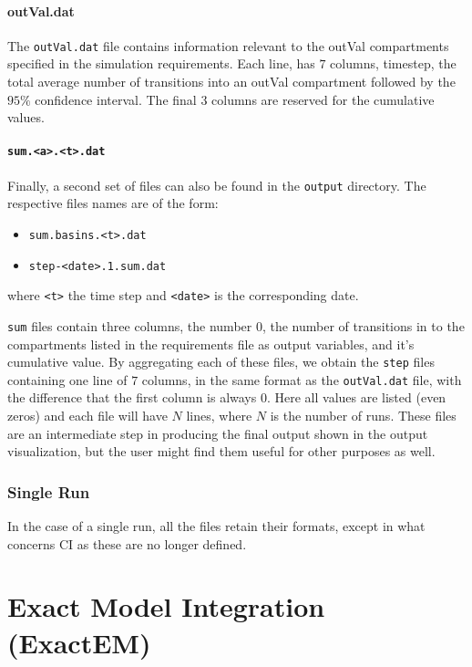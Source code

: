 \documentclass[a4paper, 11pt, fleqn]{paper}
\begin{document}
\paragraph*{outVal.dat}

The \texttt{outVal.dat} file contains information relevant to the outVal compartments specified in the simulation requirements.  Each line,  has $7$ columns, timestep,  the total average number of transitions into an outVal compartment followed by the $95\%$ confidence interval. The final $3$ columns are reserved for the cumulative values.

\paragraph*{\texttt{sum.<a>.<t>.dat}}

Finally, a second set of files can also be found in the  \texttt{output} directory. The respective files names are of the form:

\begin{itemize}
\item \texttt{sum.basins.<t>.dat} 
\item \texttt{step-<date>.1.sum.dat}
\end{itemize}
where \texttt{<t>} the time step and \texttt{<date>} is the corresponding date. 

\texttt{sum} files contain three columns, the number $0$, the number of transitions in to the compartments listed in the requirements file as output variables, and it's cumulative value. By aggregating each of these files, we obtain the \texttt{step} files containing one line of $7$ columns, in the same format as the \texttt{outVal.dat} file, with the difference that the first column is always 0.
Here all values are listed (even zeros) and each file will have $N$ lines, where $N$ is the number of runs. These files are an intermediate step in producing the final output shown in the output visualization, but the user might find them useful for other purposes as well.

\subsubsection*{Single Run}

In the case of a single run, all the files retain their formats, except in what concerns CI as these are no longer defined.

\section{Exact Model Integration (ExactEM)}
\end{document}
